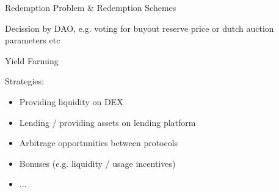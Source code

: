 \documentclass[handout]{beamer}
\begin{document}
\begin{frame}{Redemption Problem $\&$ Redemption Schemes}
		
		\begin{minipage}{0.2\textwidth}
			\begin{center}
				\scalebox{0.75}{
					\begin{tikzpicture}
											
					\end{tikzpicture}
				}		
			\end{center}
		\end{minipage}
		\hspace{1 em}
		\begin{minipage}{0.72\textwidth}
		Decission by DAO, e.g. voting for buyout reserve price or dutch auction parameters etc
		\end{minipage}
		\pause












\end{frame}


\begin{frame}{Yield Farming}

Strategies: \\ \vspace{1em}

	\begin{itemize}
	

		\item<1-> Providing liquidity on DEX
		\item<2-> Lending / providing assets on lending platform
		\item<3-> Arbitrage opportunities between protocols
		\item<4-> Bonuses (e.g. liquidity / usage incentives)
		\item<4->...
	\end{itemize}


	
\end{frame}
\end{document}
